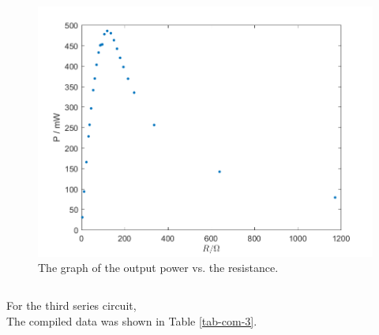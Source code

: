 \begin{figure}[H]
\centering
\includegraphics[scale=0.6]{PR2.png}
\caption{The graph of the output power vs. the resistance.}
\label{PR-2}
\end{figure}
$$$$

For the third series circuit,\\

The compiled data was shown in Table \ref{tab-com-3}.\\

